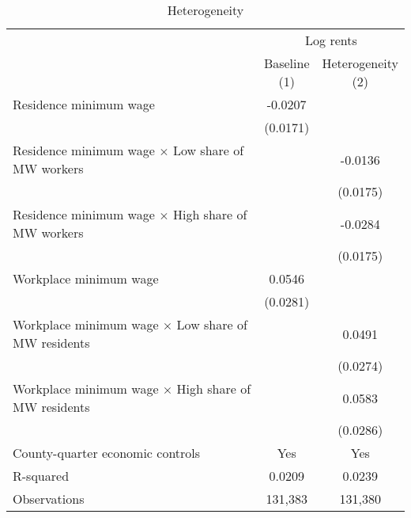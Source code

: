 \begin{table}[hbt!] \centering
    \caption{Heterogeneity}
    \label{tab:heterogeneity}
    \begin{tabular}{@{}lcc@{}}
        \toprule
            & \multicolumn{2}{c}{Log rents}                                         \\ \cmidrule(l){2-3} 
            & \shortstack{Baseline \\(1)} 
            & \shortstack{Heterogeneity \\(2)}                                      \\ \midrule
        Residence minimum wage                                     &  -0.0207   &       \\
                                                                   & (0.0171)  &       \\
        Residence minimum wage $\times$ Low share of MW workers    &        &  -0.0136  \\ 
                                                                   &        & (0.0175) \\   
        Residence minimum wage $\times$ High share of MW workers   &        &  -0.0284  \\
                                                                   &        & (0.0175) \\
        Workplace minimum wage                                     &  0.0546   &       \\
                                                                   & (0.0281)  &       \\
        Workplace minimum wage $\times$ Low share of MW residents  &        &  0.0491  \\
                                                                   &        & (0.0274) \\
        Workplace minimum wage $\times$ High share of MW residents &        &  0.0583  \\
                                                                   &        & (0.0286) \\
        County-quarter economic controls                           &  Yes   &  Yes  \\
        R-squared                                                  &  0.0209   &  0.0239  \\
        Observations                                               &  131,383  &  131,380 \\ \bottomrule
    \end{tabular}


\end{table}
